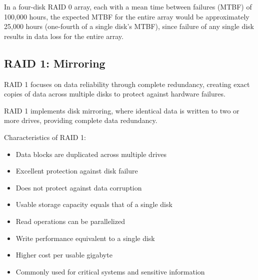 \documentclass[../../compsys.tex]{subfiles}
\begin{document}
\begin{example}
In a four-disk RAID 0 array, each with a mean time between failures (MTBF) of 100,000 hours, the expected MTBF for the entire array would be approximately 25,000 hours (one-fourth of a single disk's MTBF), since failure of any single disk results in data loss for the entire array.
\end{example}

\subsection{RAID 1: Mirroring}
RAID 1 focuses on data reliability through complete redundancy, creating exact copies of data across multiple disks to protect against hardware failures. \\[5px]
\begin{definition}[RAID 1]
    RAID 1 implements disk mirroring, where identical data is written to two or more drives, providing complete data redundancy.
\end{definition}
\vspace{5px}
\begin{minipage}{0.45\textwidth}
    \small
    Characteristics of RAID 1:
    \begin{itemize}
        \item Data blocks are duplicated across multiple drives
        \item Excellent protection against disk failure
        \item Does not protect against data corruption
        \item Usable storage capacity equals that of a single disk
        \item Read operations can be parallelized
        \item Write performance equivalent to a single disk
        \item Higher cost per usable gigabyte
        \item Commonly used for critical systems and sensitive information
    \end{itemize}   
\end{minipage}
\hfill
\vline
\hfill
\end{document}
